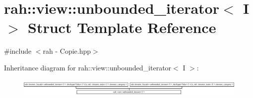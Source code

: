 \hypertarget{structrah_1_1view_1_1unbounded__iterator}{}\section{rah\+::view\+::unbounded\+\_\+iterator$<$ I $>$ Struct Template Reference}
\label{structrah_1_1view_1_1unbounded__iterator}


{\ttfamily \#include $<$rah -\/ Copie.\+hpp$>$}

Inheritance diagram for rah\+::view\+::unbounded\+\_\+iterator$<$ I $>$\+:\begin{figure}[H]
\begin{center}
\leavevmode
\includegraphics[height=0.844646cm]{structrah_1_1view_1_1unbounded__iterator}
\end{center}
\end{figure}
